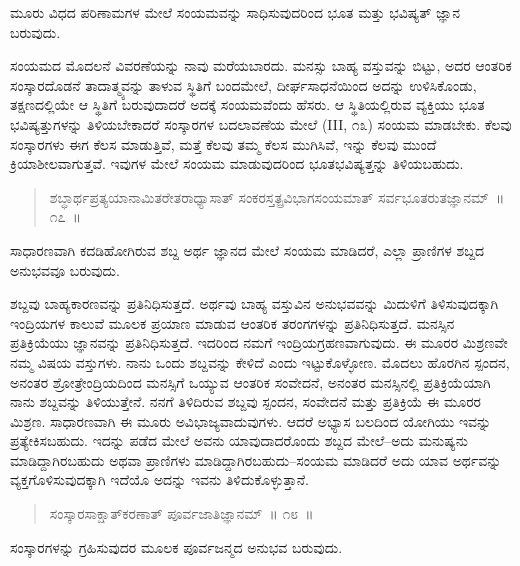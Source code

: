 ಮೂರು ವಿಧದ ಪರಿಣಾಮಗಳ ಮೇಲೆ ಸಂಯಮವನ್ನು ಸಾಧಿಸುವುದರಿಂದ ಭೂತ ಮತ್ತು ಭವಿಷ್ಯತ್​ ಜ್ಞಾನ ಬರುವುದು. 

ಸಂಯಮದ ಮೊದಲನೆ ವಿವರಣೆಯನ್ನು ನಾವು ಮರೆಯಬಾರದು. ಮನಸ್ಸು ಬಾಹ್ಯ ವಸ್ತುವನ್ನು ಬಿಟ್ಟು, ಅದರ ಆಂತರಿಕ ಸಂಸ್ಕಾರದೊಡನೆ ತಾದಾತ್ಮ್ಯವನ್ನು ತಾಳುವ ಸ್ಥಿತಿಗೆ ಬಂದಮೇಲೆ, ದೀರ್ಘಸಾಧನೆಯಿಂದ ಅದನ್ನು ಉಳಿಸಿಕೊಂಡು, ತಕ್ಷಣದಲ್ಲಿಯೇ ಆ ಸ್ಥಿತಿಗೆ ಬರುವುದಾದರೆ ಅದಕ್ಕೆ ಸಂಯಮವೆಂದು ಹೆಸರು. ಆ ಸ್ಥಿತಿಯಲ್ಲಿರುವ ವ್ಯಕ್ತಿಯು ಭೂತ ಭವಿಷ್ಯತ್ತುಗಳನ್ನು ತಿಳಿಯಬೇಕಾದರೆ ಸಂಸ್ಕಾರಗಳ ಬದಲಾವಣೆಯ ಮೇಲೆ (III, ೧೩) ಸಂಯಮ ಮಾಡಬೇಕು. ಕೆಲವು ಸಂಸ್ಕಾರಗಳು ಈಗ ಕೆಲಸ ಮಾಡುತ್ತಿವೆ, ಮತ್ತೆ ಕೆಲವು ತಮ್ಮ ಕೆಲಸ ಮುಗಿಸಿವೆ, ಇನ್ನು ಕೆಲವು ಮುಂದೆ ಕ್ರಿಯಾಶೀಲವಾಗುತ್ತವೆ. ಇವುಗಳ ಮೇಲೆ ಸಂಯಮ ಮಾಡುವುದರಿಂದ ಭೂತಭವಿಷ್ಯತ್ತನ್ನು ತಿಳಿಯಬಹುದು.

\vspace{-0.2cm}

\begin{verse}
ಶಬ್ಧಾರ್ಥಪ್ರತ್ಯಯಾನಾಮಿತರೇತರಾಧ್ಯಾಸಾತ್​ ಸಂಕರಸ್ತತ್ಪ್ರವಿಭಾಗಸಂಯಮಾತ್​ ಸರ್ವಭೂತರುತಜ್ಞಾನಮ್​~॥ ೧೭~॥
\end{verse}

\vspace{-0.2cm}

ಸಾಧಾರಣವಾಗಿ ಕದಡಿಹೋಗಿರುವ ಶಬ್ದ ಅರ್ಥ ಜ್ಞಾನದ ಮೇಲೆ ಸಂಯಮ ಮಾಡಿದರೆ, ಎಲ್ಲಾ ಪ್ರಾಣಿಗಳ ಶಬ್ದದ ಅನುಭವವೂ ಬರುವುದು. 

ಶಬ್ದವು ಬಾಹ್ಯಕಾರಣವನ್ನು ಪ್ರತಿನಿಧಿಸುತ್ತದೆ. ಅರ್ಥವು ಬಾಹ್ಯ ವಸ್ತುವಿನ ಅನುಭವವನ್ನು ಮಿದುಳಿಗೆ ತಿಳಿಸುವುದಕ್ಕಾಗಿ ಇಂದ್ರಿಯಗಳ ಕಾಲುವೆ ಮೂಲಕ ಪ್ರಯಾಣ ಮಾಡುವ ಆಂತರಿಕ ತರಂಗಗಳನ್ನು ಪ್ರತಿನಿಧಿಸುತ್ತದೆ. ಮನಸ್ಸಿನ ಪ್ರತಿಕ್ರಿಯೆಯು ಜ್ಞಾನವನ್ನು ಪ್ರತಿನಿಧಿಸುತ್ತದೆ. ಇದರಿಂದ ನಮಗೆ ಇಂದ್ರಿಯಗ್ರಹಣವಾಗುವುದು. ಈ ಮೂರರ ಮಿಶ್ರಣವೇ ನಮ್ಮ ವಿಷಯ ವಸ್ತುಗಳು. ನಾನು ಒಂದು ಶಬ್ದವನ್ನು ಕೇಳಿದೆ ಎಂದು ಇಟ್ಟುಕೊಳ್ಳೋಣ. ಮೊದಲು ಹೊರಗಿನ ಸ್ಪಂದನ, ಅನಂತರ ಶ್ರೋತ್ರೇಂದ್ರಿಯದಿಂದ ಮನಸ್ಸಿಗೆ ಒಯ್ಯುವ ಆಂತರಿಕ ಸಂವೇದನೆ, ಅನಂತರ ಮನಸ್ಸಿನಲ್ಲಿ ಪ್ರತಿಕ್ರಿಯೆಯಾಗಿ ನಾನು ಶಬ್ದವನ್ನು ತಿಳಿಯುತ್ತೇನೆ. ನನಗೆ ತಿಳಿದಿರುವ ಶಬ್ದವು ಸ್ಪಂದನ, ಸಂವೇದನೆ ಮತ್ತು ಪ್ರತಿಕ್ರಿಯೆ ಈ ಮೂರರ ಮಿಶ್ರಣ. ಸಾಧಾರಣವಾಗಿ ಈ ಮೂರು ಅವಿಭಾಜ್ಯವಾದುವುಗಳು. ಆದರೆ ಅಭ್ಯಾಸ ಬಲದಿಂದ ಯೋಗಿಯು ಇವನ್ನು ಪ್ರತ್ಯೇಕಿಸಬಹುದು. ಇದನ್ನು ಪಡೆದ ಮೇಲೆ ಅವನು ಯಾವುದಾದರೊಂದು ಶಬ್ದದ ಮೇಲೆ–ಅದು ಮನುಷ್ಯನು ಮಾಡಿದ್ದಾಗಿರಬಹುದು ಅಥವಾ ಪ್ರಾಣಿಗಳು ಮಾಡಿದ್ದಾಗಿರಬಹುದು–ಸಂಯಮ ಮಾಡಿದರೆ ಅದು ಯಾವ ಅರ್ಥವನ್ನು ವ್ಯಕ್ತಗೊಳಿಸುವುದಕ್ಕಾಗಿ ಇದೆಯೊ ಅದನ್ನು ಇವನು ತಿಳಿದುಕೊಳ್ಳುತ್ತಾನೆ. 

\vspace{-0.2cm}

\begin{verse}
ಸಂಸ್ಕಾರಸಾಕ್ಷಾತ್​ಕರಣಾತ್​ ಪೂರ್ವಜಾತಿಜ್ಞಾನಮ್​~॥ ೧೮~॥
\end{verse}

\vspace{-0.2cm}

ಸಂಸ್ಕಾರಗಳನ್ನು ಗ್ರಹಿಸುವುದರ ಮೂಲಕ ಪೂರ್ವಜನ್ಮದ ಅನುಭವ ಬರುವುದು. 

